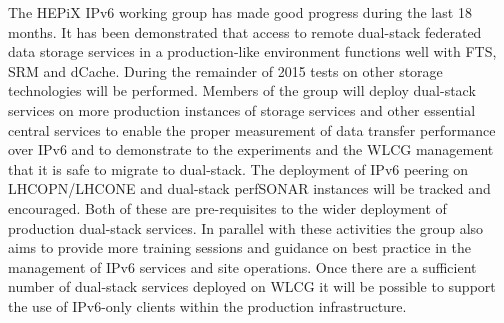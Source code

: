 The HEPiX IPv6 working group has made good progress during the last 18 months. It has been demonstrated that access 
to remote dual-stack federated data storage services in a production-like environment functions well with FTS, SRM and dCache.
During the remainder of 2015 tests on other storage technologies will be performed. Members of the group will deploy dual-stack services
on more production instances of storage services and other essential central services to enable the proper measurement of 
data transfer performance over IPv6 and to 
demonstrate to the experiments and the WLCG management that it is safe to migrate to dual-stack. The deployment of IPv6 peering on 
LHCOPN/LHCONE and dual-stack perfSONAR instances will be tracked and encouraged. Both of these are pre-requisites to the wider deployment
of production dual-stack services. In parallel with these activities the group also aims to provide more training sessions and guidance
on best practice in the management of IPv6 services and site operations. Once there are a sufficient number of dual-stack services 
deployed on WLCG it will be possible to support the use of IPv6-only clients within the production infrastructure.